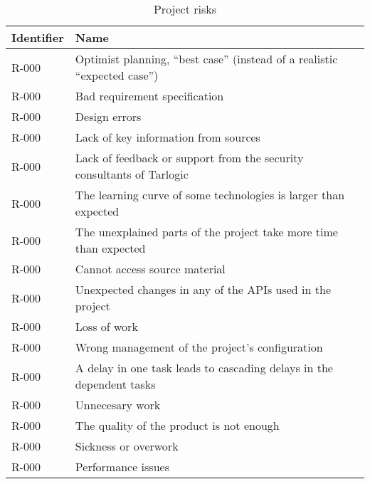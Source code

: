 \begin{table}[H]
	\caption{Project risks}
	\begin{tabularx}{\textwidth}{|l|X|}
		\hline
		\rowcolor{gray!30}
		Identifier & Name \\ \hline
		R-000 & Optimist planning, ``best case'' (instead of a realistic ``expected case'')\\ \hline
		R-000 & Bad requirement specification\\ \hline
		R-000 & Design errors\\ \hline

		R-000 & Lack of key information from sources\\ \hline 		%
		R-000 & Lack of feedback or support from the security consultants of Tarlogic\\ \hline 		%
		R-000 & The learning curve of some technologies is larger than expected\\ \hline
		R-000 & The unexplained parts of the project take more time than expected\\ \hline

		R-000 & Cannot access source material\\ \hline 		%
		R-000 & Unexpected changes in any of the APIs used in the project\\ \hline

		R-000 & Loss of work\\ \hline 	%
		R-000 & Wrong management of the project's configuration\\ \hline 	%
		R-000 & A delay in one task leads to cascading delays in the dependent tasks\\ \hline

		R-000 & Unnecesary work\\ \hline 		%
		R-000 & The quality of the product is not enough\\ \hline 	%
		R-000 & Sickness or overwork\\ \hline
		R-000 & Performance issues\\ \hline 	%
	\end{tabularx}
\end{table}





